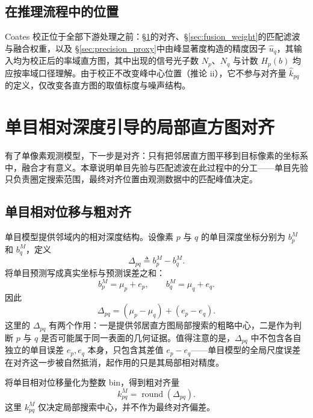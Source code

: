 \documentclass[11pt,a4paper]{ctexart}
\numberwithin{equation}{section}
\begin{document}
\subsection{在推理流程中的位置}

Coates 校正位于全部下游处理之前：\S\ref{sec:alignment}的对齐、\S\ref{sec:fusion_weight}的匹配滤波与融合权重，以及 \S\ref{sec:precision_proxy}中由峰显著度构造的精度因子 $\hat u_q$，其输入均为校正后的率域直方图，其中出现的信号光子数 $N_p$、$N_q$ 与计数 $H_p(b)$ 均应按率域口径理解。由于校正不改变峰中心位置（推论 ii），它不参与对齐量 $\hat k_{pq}$ 的定义，仅改变各直方图的取值标度与噪声结构。

\section{单目相对深度引导的局部直方图对齐}
\label{sec:alignment}

有了单像素观测模型，下一步是对齐：只有把邻居直方图平移到目标像素的坐标系中，融合才有意义。本章说明单目先验与匹配滤波在此过程中的分工——单目先验只负责圈定搜索范围，最终对齐位置由观测数据中的匹配峰值决定。

\subsection{单目相对位移与粗对齐}

单目模型提供邻域内的相对深度结构。设像素 $p$ 与 $q$ 的单目深度坐标分别为 $b_p^M$ 和 $b_q^M$，定义
\begin{equation}
    \Delta_{pq}
    \triangleq
    b_p^M-b_q^M.
    \label{eq:delta_mono}
\end{equation}
将单目预测写成真实坐标与预测误差之和：
\begin{equation}
    b_p^M=\mu_p+e_p,
    \qquad
    b_q^M=\mu_q+e_q.
    \label{eq:mono_error}
\end{equation}
因此
\begin{equation}
    \Delta_{pq}
    =
    (\mu_p-\mu_q)+(e_p-e_q).
    \label{eq:delta_error}
\end{equation}
这里的 $\Delta_{pq}$ 有两个作用：一是提供邻居直方图局部搜索的粗略中心，二是作为判断 $p$ 与 $q$ 是否可能属于同一表面的几何证据。值得注意的是，$\Delta_{pq}$ 中不包含各自独立的单目误差 $e_p,e_q$ 本身，只包含其差值 $e_p-e_q$——单目模型的全局尺度误差在对齐这一步被自然抵消，起作用的只是其局部相对精度。

将单目相对位移量化为整数 bin，得到粗对齐量
\begin{equation}
    k_{pq}^{M}
    =
    \operatorname{round}(\Delta_{pq}).
    \label{eq:coarse_shift}
\end{equation}
这里 $k_{pq}^{M}$ 仅决定局部搜索中心，并不作为最终对齐偏差。
\end{document}
